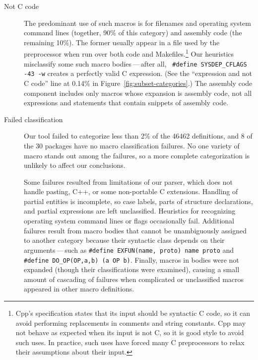 \documentclass[10pt]{article}
\def\numpackages{30}
\begin{document}
\begin{description}
\item[Not C code]\label{page:not-c-code}
  The predominant use of such macros is for filenames and operating system
  command lines (together, 90\% of this category) and assembly code (the
  remaining 10\%).  The former usually appear in a file used by
  the preprocessor when run over both code and Makefiles.\footnote{Cpp's
    specification states that its input should be syntactic C code, so it
    can avoid performing replacements in comments and string constants.
    Cpp may not behave as expected when its input is not C, so it is good
    style to avoid such uses.  In practice, such uses have forced many C
    preprocessors to relax their assumptions about their input.}  Our
  heuristics misclassify some such macro bodies\,---\,after all, {\tt
  \#define \verb|SYSDEP_CFLAGS| -43 -w} creates a perfectly valid C
expression.  (See the ``expression and not C code'' line at 0.14\% in
Figure~\ref{fig:subset-categories}.)  The assembly code component includes
only macros whose expansion is assembly code, not all expressions and
statements that contain snippets of assembly code.

\item[Failed classification]
  Our tool failed to categorize less than 2\% of the 46462 definitions, and
  8 of the {\numpackages} packages have no macro classification failures.
  No one variety of macro stands out among the failures, so a more complete
  categorization is unlikely to affect our conclusions.
  
  Some failures resulted from limitations of our parser, which does not
  handle pasting, C++, or some
  non-portable C extensions.  Handling of partial entities is incomplete,
  so case labels, parts of structure declarations, and partial expressions
  are left unclassified.  Heuristics for recognizing operating system
  command lines or flags occasionally fail.  Additional failures result
  from macro bodies that cannot be unambiguously assigned to another
  category because their syntactic class depends on their
  arguments\,---\,such as {\tt \#define EXFUN(name, proto) name proto} and
  {\tt \#define
\verb|DO_OP|(OP,a,b) (a OP b)}.  Finally, macros in bodies were not
expanded (though their classifications were examined), causing a small
amount of cascading of failures when complicated or unclassified macros
appeared in other macro definitions.

\end{description}
\end{document}
